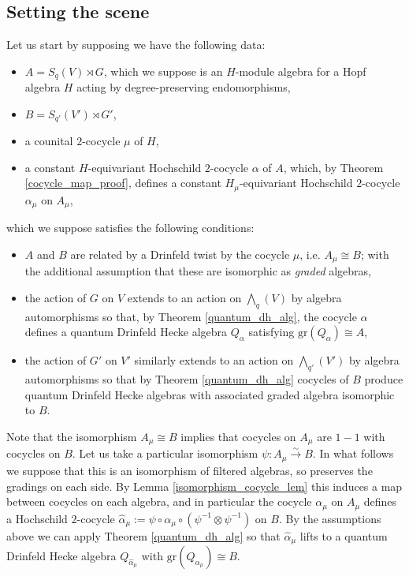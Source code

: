 \documentclass[10pt]{article}
\newcommand{\bb}{\medbreak}
\newcommand{\nt}{\noindent}
\newcommand{\xrt}{\xrightarrow}
\newcommand{\gr}{\text{gr}}
\theoremstyle{definition}
\begin{document}
\subsection{Setting the scene}\label{setting_the_scene}
Let us start by supposing we have the following data:
\begin{itemize}
    \item $A=S_q(V)\rtimes G$, which we suppose is an $H$-module algebra for a Hopf algebra $H$ acting by degree-preserving endomorphisms,
    \item $B=S_{q'}(V')\rtimes G'$,
    \item a counital $2$-cocycle $\mu$ of $H$, 
    \item a constant $H$-equivariant Hochschild $2$-cocycle $\alpha$ of $A$, which, by Theorem \ref{cocycle_map_proof}, defines a constant $H_\mu$-equivariant Hochschild $2$-cocycle $\alpha_\mu$ on $A_\mu$,
\end{itemize}
which we suppose satisfies the following conditions:
\begin{itemize}
    \item $A$ and $B$ are related by a Drinfeld twist by the cocycle $\mu$, i.e. $A_\mu \cong B$; with the additional assumption that these are isomorphic as \textit{graded} algebras, %
    \item the action of $G$ on $V$ extends to an action on $\bigwedge_q(V)$ by algebra automorphisms so that, by Theorem \ref{quantum_dh_alg}, the cocycle $\alpha$ defines a quantum Drinfeld Hecke algebra $Q_\alpha$ satisfying $\gr(Q_\alpha)\cong A$,
    \item the action of $G'$ on $V'$ similarly extends to an action on $\bigwedge_{q'}(V')$ by algebra automorphisms so that by Theorem \ref{quantum_dh_alg} cocycles of $B$ produce quantum Drinfeld Hecke algebras with associated graded algebra isomorphic to $B$.
\end{itemize}

\nt Note that the isomorphism $A_\mu\cong B$ implies that cocycles on $A_\mu$ are $1-1$ with cocycles on $B$. Let us take a particular isomorphism $\psi:A_\mu\xrt{\sim} B$. In what follows we suppose that this is an isomorphism of filtered algebras, so preserves the gradings on each side. By Lemma \ref{isomorphism_cocycle_lem} this induces a map between cocycles on each algebra, and in particular the cocycle $\alpha_\mu$ on $A_\mu$ defines a Hochschild $2$-cocycle $\hat{\alpha}_\mu:=\psi\circ \alpha_\mu\circ (\psi^{-1}\otimes \psi^{-1})$ on $B$. By the assumptions above we can apply Theorem \ref{quantum_dh_alg} so that $\hat{\alpha}_\mu$ lifts to a quantum Drinfeld Hecke algebra $Q_{\hat{\alpha}_\mu}$ with $\gr(Q_{\alpha_\mu})\cong B$.\bb
\end{document}
